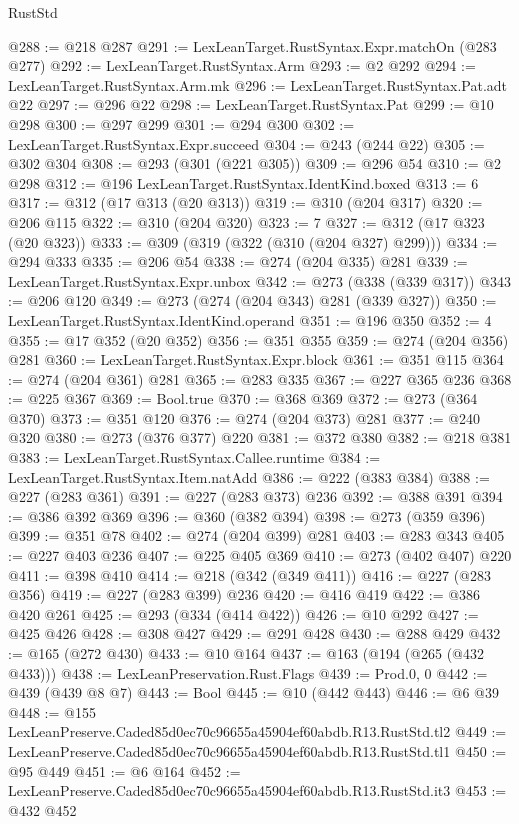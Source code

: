 \begin{lexlean}{RustStd}
\begin{coremodule}
@288 := @218 @287
@291 := LexLeanTarget.RustSyntax.Expr.matchOn (@283 @277)
@292 := LexLeanTarget.RustSyntax.Arm
@293 := @2 @292
@294 := LexLeanTarget.RustSyntax.Arm.mk
@296 := LexLeanTarget.RustSyntax.Pat.adt @22
@297 := @296 @22
@298 := LexLeanTarget.RustSyntax.Pat
@299 := @10 @298
@300 := @297 @299
@301 := @294 @300
@302 := LexLeanTarget.RustSyntax.Expr.succeed
@304 := @243 (@244 @22)
@305 := @302 @304
@308 := @293 (@301 (@221 @305))
@309 := @296 @54
@310 := @2 @298
@312 := @196 LexLeanTarget.RustSyntax.IdentKind.boxed
@313 := 6
@317 := @312 (@17 @313 (@20 @313))
@319 := @310 (@204 @317)
@320 := @206 @115
@322 := @310 (@204 @320)
@323 := 7
@327 := @312 (@17 @323 (@20 @323))
@333 := @309 (@319 (@322 (@310 (@204 @327) @299)))
@334 := @294 @333
@335 := @206 @54
@338 := @274 (@204 @335) @281
@339 := LexLeanTarget.RustSyntax.Expr.unbox
@342 := @273 (@338 (@339 @317))
@343 := @206 @120
@349 := @273 (@274 (@204 @343) @281 (@339 @327))
@350 := LexLeanTarget.RustSyntax.IdentKind.operand
@351 := @196 @350
@352 := 4
@355 := @17 @352 (@20 @352)
@356 := @351 @355
@359 := @274 (@204 @356) @281
@360 := LexLeanTarget.RustSyntax.Expr.block
@361 := @351 @115
@364 := @274 (@204 @361) @281
@365 := @283 @335
@367 := @227 @365 @236
@368 := @225 @367
@369 := Bool.true
@370 := @368 @369
@372 := @273 (@364 @370)
@373 := @351 @120
@376 := @274 (@204 @373) @281
@377 := @240 @320
@380 := @273 (@376 @377) @220
@381 := @372 @380
@382 := @218 @381
@383 := LexLeanTarget.RustSyntax.Callee.runtime
@384 := LexLeanTarget.RustSyntax.Item.natAdd
@386 := @222 (@383 @384)
@388 := @227 (@283 @361)
@391 := @227 (@283 @373) @236
@392 := @388 @391
@394 := @386 @392 @369
@396 := @360 (@382 @394)
@398 := @273 (@359 @396)
@399 := @351 @78
@402 := @274 (@204 @399) @281
@403 := @283 @343
@405 := @227 @403 @236
@407 := @225 @405 @369
@410 := @273 (@402 @407) @220
@411 := @398 @410
@414 := @218 (@342 (@349 @411))
@416 := @227 (@283 @356)
@419 := @227 (@283 @399) @236
@420 := @416 @419
@422 := @386 @420 @261
@425 := @293 (@334 (@414 @422))
@426 := @10 @292
@427 := @425 @426
@428 := @308 @427
@429 := @291 @428
@430 := @288 @429
@432 := @165 (@272 @430)
@433 := @10 @164
@437 := @163 (@194 (@265 (@432 @433)))
@438 := LexLeanPreservation.Rust.Flags
@439 := Prod.{0, 0}
@442 := @439 (@439 @8 @7)
@443 := Bool
@445 := @10 (@442 @443)
@446 := @6 @39
@448 := @155 LexLeanPreserve.Caded85d0ec70c96655a45904ef60abdb.R13.RustStd.tl2
@449 := LexLeanPreserve.Caded85d0ec70c96655a45904ef60abdb.R13.RustStd.tl1
@450 := @95 @449
@451 := @6 @164
@452 := LexLeanPreserve.Caded85d0ec70c96655a45904ef60abdb.R13.RustStd.it3
@453 := @432 @452

\end{coremodule}
\end{lexlean}
